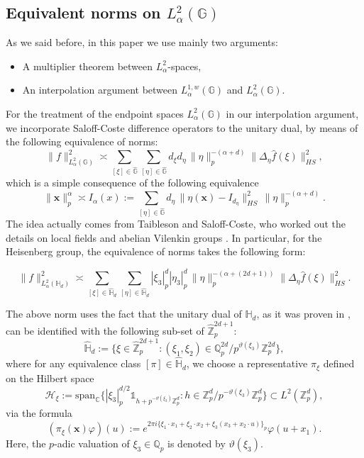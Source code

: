 \documentclass[12pt, reqno]{amsart}
\newcommand{\1}{\mathds{1}}
\newcommand{\G}{\mathbb{G}}
\begin{document}
\subsection{Equivalent norms on $L^2_\alpha (\mathbb{G}) $}
As we said before, in this paper we use mainly two arguments:

\begin{itemize}
    \item[(i)] A multiplier theorem between $L^2_\alpha$-spaces,
    \item[(ii)] An interpolation argument between $L^{1,w}_\alpha (\G)$ and $L^2_\alpha(\G)$. 
\end{itemize}

For the treatment of the endpoint spaces $L^2_\alpha(\mathbb{G})$ in our interpolation argument, we incorporate Saloff-Coste difference operators to the unitary dual, by means of the following equivalence of norms:
\begin{equation}\label{eq1}
\boxed{\| f \|_{L^2_\alpha(\mathbb{G})}^2 \asymp \sum_{[\xi] \in \widehat{\mathbb{G}}} \sum_{[\eta] \in \widehat{\mathbb{G}}} d_\xi d_\eta  \, \| \eta \|_p^{-(\alpha + d)} \| \Delta_\eta \widehat{f}(\xi) \|_{HS}^2,}
\end{equation}
which is a simple consequence of the following equivalence \begin{equation}
    \boxed{ \|\mathbf{x}\|_{p}^\alpha \asymp I_\alpha(x) := 
    \sum_{[\eta] \in \widehat{\mathbb{G}}} 
    d_\eta \, \|\eta(\mathbf{x}) - I_{d_\eta} \|^2_{HS} \, 
    \|\eta\|_p^{-(\alpha+d)}.}
\end{equation}
The idea actually comes from Taibleson and Saloff-Coste, who worked out the details on local fields and abelian Vilenkin groups \cite{SaloffCoste1986}. In particular, for the Heisenberg group, the equivalence of norms takes the following form:


\begin{equation}\label{eq1Heis}
\boxed{\| f \|_{L^2_\alpha(\mathbb{H}_d)}^2 \asymp \sum_{[\xi] \in \widehat{\mathbb{H}}_d} \sum_{[\eta] \in \widehat{\mathbb{H}}_d} |\xi_3|_p^d |\eta_3|_p^d \, \| \eta \|_p^{-(\alpha + (2d + 1))} \| \Delta_\eta \widehat{f}(\xi) \|_{HS}^2.}
\end{equation}


The above norm uses the fact that the unitary dual of $\mathbb{H}_d$, as it was proven in \cite{velasquezrodriguez2024heisenberg}, can be identified with the following sub-set of $\widehat{\mathbb{Z}}_p^{2d+1}$:
\[
\widehat{\mathbb{H}}_d := \{ \xi \in \widehat{\mathbb{Z}}_p^{2d+1} : (\xi_1, \xi_2) \in \mathbb{Q}_p^{2d} / p^{\vartheta(\xi_3)} \mathbb{Z}_p^{2d} \},
\]
where for any equivalence class $[\pi] \in \widehat{\mathbb{H}}_d$, we choose a representative $\pi_\xi$ defined on the Hilbert space
\[
\mathcal{H}_\xi := \mathrm{span}_\mathbb{C} \Big\{ |\xi_3|_p^{d/2} \mathbb{1}_{h + p^{-\vartheta(\xi_3)} \mathbb{Z}_p^d} : h \in \mathbb{Z}_p^d / p^{-\vartheta(\xi_3)} \mathbb{Z}_p^d \Big\} \subset L^2(\mathbb{Z}_p^d),
\]
via the formula
\[
(\pi_\xi(\mathbf{x}) \varphi)(u) := e^{2\pi i \{ \xi_1 \cdot x_1 + \xi_2 \cdot x_2 + \xi_3(x_3 + x_2 \cdot u) \}_p} \varphi(u + x_1).
\]Here, the $p$-adic valuation of $\xi_3 \in \mathbb{Q}_p$ is denoted by $\vartheta(\xi_3)$.
\end{document}
